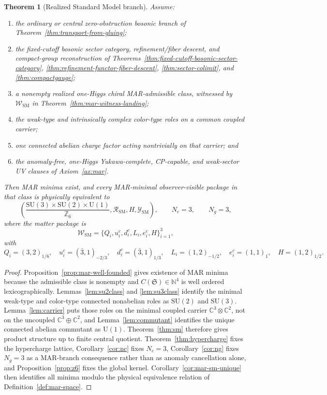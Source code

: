 \documentclass[11pt]{article}
\newtheorem{theorem}{Theorem}[section]
\newcommand{\SU}{\mathrm{SU}}
\newcommand{\U}{\mathrm{U}}
\begin{document}
\begin{theorem}[Realized Standard Model branch]\label{thm:realized-sm-branch}
Assume:
\begin{enumerate}[label=\textup{(\arabic*)},leftmargin=2em]
\item the ordinary or central zero-obstruction bosonic branch of
Theorem~\ref{thm:transport-from-gluing};
\item the fixed-cutoff bosonic sector category, refinement/fiber descent, and compact-group
reconstruction of Theorems~\ref{thm:fixed-cutoff-bosonic-sector-category},
\ref{thm:refinement-functor-fiber-descent}, \ref{thm:sector-colimit}, and
\ref{thm:compactgauge};
\item a nonempty realized one-Higgs chiral MAR-admissible class, witnessed by
\(\mathcal W_{\mathrm{SM}}\) in Theorem~\ref{thm:mar-witness-landing};
\item the weak-type and intrinsically complex color-type roles on a common coupled carrier;
\item one connected abelian charge factor acting nontrivially on that carrier; and
\item the anomaly-free, one-Higgs Yukawa-complete, CP-capable, and weak-sector UV clauses of
Axiom~\ref{ax:mar}.
\end{enumerate}
Then MAR minima exist, and every MAR-minimal observer-visible package in that class is physically
equivalent to
\[
\left(
\frac{\SU(3)\times\SU(2)\times\U(1)}{\mathbb Z_6},
\mathcal R_{\mathrm{SM}},
H,
\mathcal Y_{\mathrm{SM}}
\right),
\qquad
N_c=3,\qquad N_g=3,
\]
where the matter package is
\[
\mathcal W_{\mathrm{SM}}
=
\{Q_i,u_i^c,d_i^c,L_i,e_i^c,H\}_{i=1}^{3},
\]
with
\[
Q_i=(3,2)_{1/6},\quad
u_i^c=(\bar 3,1)_{-2/3},\quad
d_i^c=(\bar 3,1)_{1/3},\quad
L_i=(1,2)_{-1/2},\quad
e_i^c=(1,1)_1,\quad
H=(1,2)_{1/2}.
\]
\end{theorem}

\begin{proof}
Proposition~\ref{prop:mar-well-founded} gives existence of MAR minima because the admissible
class is nonempty and \(C(\mathfrak S)\in\mathbb N^4\) is well ordered lexicographically.
Lemmas~\ref{lem:su2class} and \ref{lem:su3class} identify the minimal weak-type and color-type
connected nonabelian roles as \(\SU(2)\) and \(\SU(3)\). Lemma~\ref{lem:carrier} puts those roles
on the minimal coupled carrier \(\mathbb C^3\otimes\mathbb C^2\), not on the uncoupled
\(\mathbb C^3\oplus\mathbb C^2\), and Lemma~\ref{lem:commutant} identifies the unique connected
abelian commutant as \(\U(1)\). Theorem~\ref{thm:sm} therefore gives product structure up to
finite central quotient. Theorem~\ref{thm:hypercharge} fixes the hypercharge lattice,
Corollary~\ref{cor:nc} fixes \(N_c=3\), Corollary~\ref{cor:ng} fixes \(N_g=3\) as a
MAR-branch consequence rather than as anomaly cancellation alone, and Proposition~\ref{prop:z6}
fixes the global kernel. Corollary~\ref{cor:mar-sm-unique} then identifies all minima modulo
the physical equivalence relation of Definition~\ref{def:mar-space}.
\end{proof}
\end{document}
